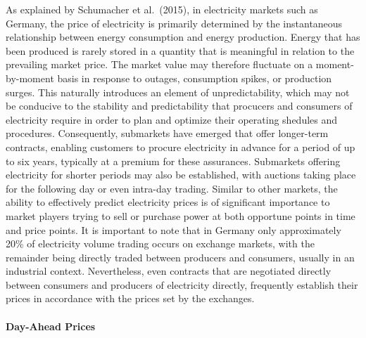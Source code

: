 \documentclass[a4paper]{article}
\begin{document}
As explained by Schumacher et al.~(2015), in electricity markets such as
Germany, the price of electricity is primarily determined by the
instantaneous relationship between energy consumption and energy
production. Energy that has been produced is rarely stored in a quantity
that is meaningful in relation to the prevailing market price. The
market value may therefore fluctuate on a moment-by-moment basis in
response to outages, consumption spikes, or production surges. This
naturally introduces an element of unpredictability, which may not be
conducive to the stability and predictability that procucers and
consumers of electricity require in order to plan and optimize their
operating shedules and procedures. Consequently, submarkets have emerged
that offer longer-term contracts, enabling customers to procure
electricity in advance for a period of up to six years, typically at a
premium for these assurances. Submarkets offering electricity for
shorter periods may also be established, with auctions taking place for
the following day or even intra-day trading. Similar to other markets,
the ability to effectively predict electricity prices is of significant
importance to market players trying to sell or purchase power at both
opportune points in time and price points. It is important to note that
in Germany only approximately 20\% of electricity volume trading occurs
on exchange markets, with the remainder being directly traded between
producers and consumers, usually in an industrial context. Nevertheless,
even contracts that are negotiated directly between consumers and
producers of electricity directly, frequently establish their prices in
accordance with the prices set by the exchanges.

\paragraph{Day-Ahead Prices}\label{day-ahead-prices}
\end{document}
